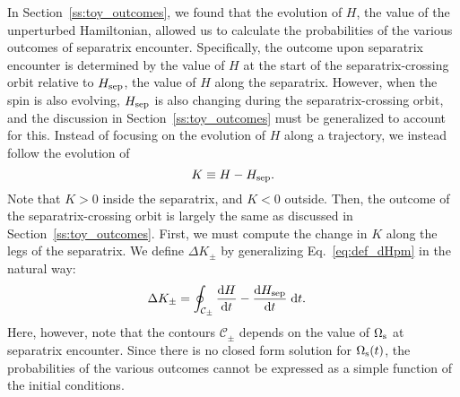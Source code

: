 \documentclass[
        fleqn,
        usenatbib,
    ]{mnras}
\newcommand*{\rd}[2]{\frac{\mathrm{d}#1}{\mathrm{d}#2}}
\begin{document}
In Section~\ref{ss:toy_outcomes}, we found that the evolution of $H$, the value
of the unperturbed Hamiltonian, allowed us to calculate the probabilities of the
various outcomes of separatrix encounter. Specifically, the outcome upon
separatrix encounter is determined by the value of $H$ at the start of the
separatrix-crossing orbit relative to $H_{\rm sep}$, the value of $H$ along the
separatrix. However, when the spin is also evolving, $H_{\rm sep}$ is also
changing during the separatrix-crossing orbit, and the discussion in
Section~\ref{ss:toy_outcomes} must be generalized to account for this. Instead
of focusing on the evolution of $H$ along a trajectory, we instead follow the
evolution of
\begin{equation}
    K \equiv H - H_{\rm sep}.
\end{equation}
Note that $K > 0$ inside the separatrix, and $K < 0$ outside. Then, the outcome
of the separatrix-crossing orbit is largely the same as discussed in
Section~\ref{ss:toy_outcomes}. First, we must compute the change in $K$ along
the legs of the separatrix. We define $\Delta K_{\pm}$ by generalizing
Eq.~\eqref{eq:def_dHpm} in the natural way:
\begin{align}
    \Delta K_{\pm} &= \oint_{\mathcal{C}_{\pm}} \rd{H}{t}
        - \rd{H_{\rm sep}}{t}\;\mathrm{d}t.\label{eq:def_dK_weaktide}
\end{align}
Here, however, note that the contours $\mathcal{C}_{\pm}$ depends on the value
of $\Omega_{\rm s}$ at separatrix encounter. Since there is no closed form
solution for $\Omega_{\rm s}(t)$, the probabilities of the various outcomes
cannot be expressed as a simple function of the initial conditions.
\end{document}
